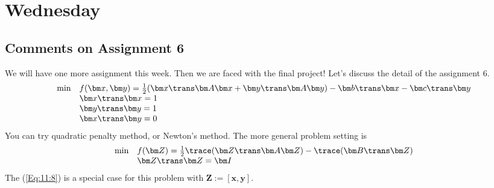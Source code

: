 
\section{Wednesday}
\subsection{Comments on Assignment 6}
We will have one more assignment this week. Then we are faced with the final project! Let's discuss the detail of the assignment 6.
\begin{equation}\label{Eq:11:8}
\begin{array}{ll}
\min&f(\bm x,\bm y)=\frac{1}{2}(\bm x\trans\bm A\bm x+\bm y\trans\bm A\bm y) - \bm b\trans\bm x-\bm c\trans\bm y\\
&\bm x\trans\bm x=1\\
&\bm y\trans\bm y=1\\
&\bm x\trans\bm y=0
\end{array}
\end{equation}
You can try quadratic penalty method, or Newton's method. The more general problem setting is
\begin{equation}
\begin{array}{ll}
\min&f(\bm Z)=\frac{1}{2}\trace(\bm Z\trans\bm A\bm Z) - \trace(\bm B\trans\bm Z)\\
&\bm Z\trans\bm Z=\bm I
\end{array}
\end{equation}
The (\ref{Eq:11:8}) is a special case for this problem with $\bm Z:=[\bm x, \bm y]$. 
